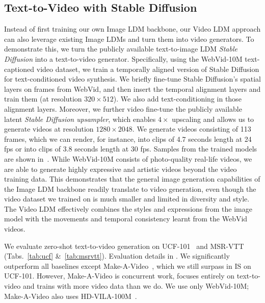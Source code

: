 \subsection{Text-to-Video with Stable Diffusion}\label{sec:text-to-video}
\vspace{-1mm}
Instead of first training our own Image LDM backbone, our Video LDM approach can also leverage existing Image LDMs and turn them into video generators. To demonstrate this, we turn the publicly available text-to-image LDM \emph{Stable Diffusion} into a text-to-video generator. Specifically, using the WebVid-10M text-captioned video dataset, we train a temporally aligned version of Stable Diffusion for text-conditioned video synthesis. We briefly fine-tune Stable Diffusion's spatial layers on frames from WebVid, and then insert the temporal alignment layers and train them (at resolution $320\times512$). We also add text-conditioning in those alignment layers. Moreover, we further video fine-tune the publicly available latent \emph{Stable Diffusion upsampler}, which enables $4\times$ upscaling and allows us to generate videos at resolution $1280\times 2048$. We generate videos consisting of 113 frames, which we can render, for instance, into clips of 4.7 seconds length at 24 fps or into clips of 3.8 seconds length at 30 fps.
Samples from the trained models are shown in~. While WebVid-10M consists of photo-quality real-life videos, we are able to generate highly expressive and artistic videos beyond the video training data. This demonstrates that the general image generation capabilities of the Image LDM backbone readily translate to video generation, even though the video dataset we trained on is much smaller and limited in diversity and style. The Video LDM effectively combines the styles and expressions from the image model with the movements and temporal consistency learnt from the WebVid videos.

We evaluate zero-shot text-to-video generation on UCF-101~\cite{soomro2012ucf101} and MSR-VTT~\cite{xu2016msr-vtt} (Tabs.~\ref{tab:ucf} \&~\ref{tab:msrvtt}).
Evaluation details in .
We significantly outperform all baselines except Make-A-Video~\cite{singer2022make}, which we still surpass in IS on UCF-101. However, Make-A-Video is concurrent work, focuses entirely on text-to-video and trains with more video data than we do. We use only WebVid-10M; Make-A-Video also uses HD-VILA-100M~\cite{xue2022hdvila}.

